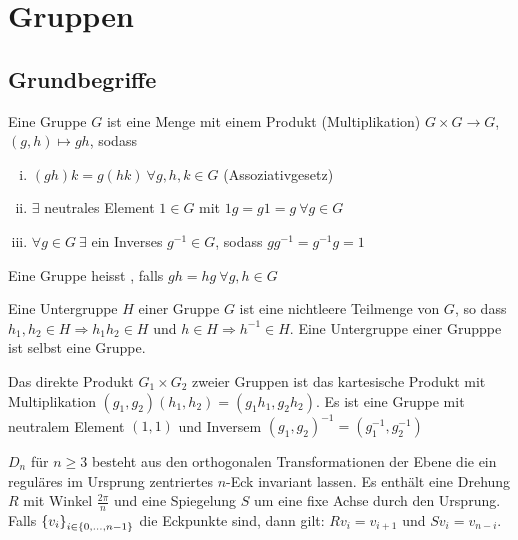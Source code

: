 \section{Gruppen}

\subsection{Grundbegriffe}

\begin{definition}[Gruppe]
    Eine Gruppe $G$ ist eine Menge mit einem Produkt (Multiplikation)
    $G \times G \rightarrow G$, $(g,h) \mapsto gh$, sodass
    \begin{enumerate}[(i)]
        \item $(g h)k = g (h k) \ \forall g,h,k \in G$ (Assoziativgesetz)
        \item $\exists$ neutrales Element $1 \in G$ mit $1 g = g 1 = g \ \forall g \in G$
        \item $\forall g \in G \ \exists$ ein Inverses $g^{-1} \in G$, sodass
            $g g^{-1} = g^{-1} g = 1$
    \end{enumerate}
    Eine Gruppe heisst , falls $gh = hg \ \forall g,h \in G$
\end{definition}

\begin{definition}[Untergruppe]
    Eine Untergruppe $H$ einer Gruppe $G$ ist eine nichtleere Teilmenge
    von $G$, so dass $h_1 , h_2 \in H \Rightarrow h_1 h_2 \in H$ und
    $h \in H \Rightarrow h^{-1} \in H$. Eine Untergruppe einer Grupppe
    ist selbst eine Gruppe.
\end{definition}

\begin{definition}
    Das direkte Produkt $G_1 \times G_2$ zweier Gruppen ist das kartesische
    Produkt mit Multiplikation $(g_1,g_2)(h_1,h_2) = (g_1 h_1 , g_2 h_2)$.
    Es ist eine Gruppe mit neutralem Element $(1,1)$ und Inversem
    $(g_1,g_2)^{-1} = (g_1^{-1} , g_2^{-1})$
\end{definition}

\begin{definition}[Diedergruppen $D_n$]
    $D_n$ für $n \geq 3$ besteht aus den orthogonalen Transformationen der
    Ebene die ein reguläres im Ursprung zentriertes $n$-Eck invariant lassen.
    Es enthält eine Drehung $R$ mit Winkel $\frac{2 \pi}{n}$ und eine Spiegelung
    $S$ um eine fixe Achse durch den Ursprung. Falls
    $\left\{ v_i \right\}_{i \in \left\{ 0,\dots,n-1 \right\}}$
    die Eckpunkte sind, dann gilt: $R v_i = v_{i+1}$ und $S v_i = v_{n-i}$.
\end{definition}

